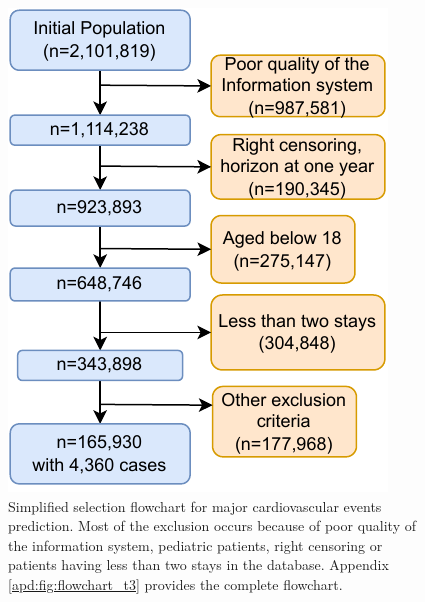\documentclass[french,12pt,twoside,a4paper]{book}
\begin{document}
\begin{figure}[!h]
\begin{minipage}{.54\linewidth}
    \caption{Simplified selection flowchart for major cardiovascular events
      prediction. Most of the exclusion occurs because of poor quality of the
      information system, pediatric patients, right censoring or patients having
      less than two stays in the database. Appendix \ref{apd:fig:flowchart_t3}
      provides the complete flowchart.}\label{fig:mace_flowchart_simple}
  \end{minipage}%
  \hfill%
  \begin{minipage}{.44\linewidth}
    \includegraphics[width=\linewidth]{img/chapter_3/mace_flowchart_simple.pdf}
  \end{minipage}
\end{figure}

\end{document}
